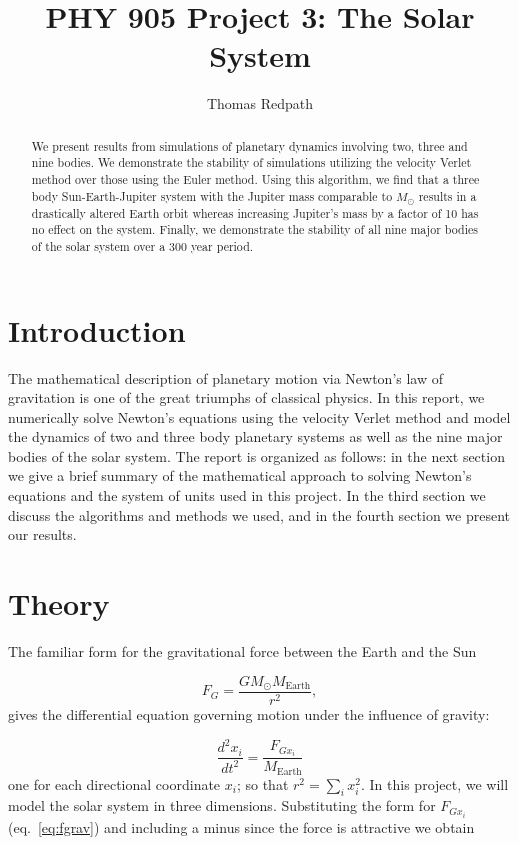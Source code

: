 \documentclass[10pt,showpacs,preprintnumbers,footinbib,amsmath,amssymb,aps,prl,twocolumn,groupedaddress,superscriptaddress,showkeys]{revtex4-1}
\newcommand{\deriv}[3][]{%
	\ensuremath{ \frac{d ^{#1} {#2}}{d {#3}^{#1}}}}
\begin{document}
\title{PHY 905 Project 3: The Solar System}
\author{Thomas Redpath}
\begin{abstract}
We present results from simulations of planetary dynamics involving two, three
and nine bodies. We demonstrate the stability of simulations utilizing the velocity
Verlet method over those using the Euler method. Using this algorithm, we find
that a three body Sun-Earth-Jupiter system with the Jupiter mass comparable
to $M _{\odot}$ results in a drastically altered Earth orbit whereas increasing
Jupiter's mass by a factor of 10 has no effect on the system. Finally, we
demonstrate the stability of all nine major bodies of the solar system over a
300 year period.
\end{abstract}
\maketitle

\section{Introduction}

The mathematical description of planetary motion via Newton's law
of gravitation is one of the great triumphs of classical physics. In this
report, we numerically solve Newton's equations using the velocity
Verlet method and model the dynamics of two and three body planetary
systems as well as the nine major bodies of the solar system. The
report is organized as follows: in the next section we give a brief summary
of the mathematical approach to solving Newton's equations and the
system of units used in this project. In the third
section we discuss the algorithms and methods we used, and in the fourth
section we present our results.


\section{Theory}

The familiar form for the gravitational force between the Earth and the Sun

\begin{equation}
	F_G=\frac{GM_{\odot}M_{\mathrm{Earth}}}{r^2},
	\label{eq:fgrav}
\end{equation}
gives the differential equation governing motion under the influence
of gravity:

\begin{equation}
	\deriv[2]{x_i}{t} = \frac{ F_{Gx_i}}{M_{\mathrm{Earth}}}
	\label{difeq}
\end{equation}
one for each directional coordinate $x_i$; so that $r^2 = \sum_i x_{i}^{2}$.
In this project, we will
model the solar system in three dimensions. Substituting the form
for $F_{Gx_i}$ (eq.~\ref{eq:fgrav}) and including a minus since the
force is attractive we obtain
\end{document}
